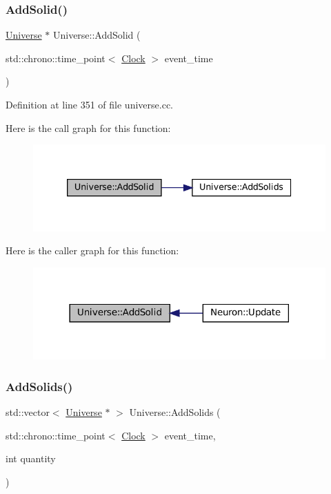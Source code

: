 \subsubsection{\texorpdfstring{Add\+Solid()}{AddSolid()}}
{\footnotesize\ttfamily \mbox{\hyperlink{class_universe}{Universe}} $\ast$ Universe\+::\+Add\+Solid (\begin{DoxyParamCaption}\item[{std\+::chrono\+::time\+\_\+point$<$ \mbox{\hyperlink{universe_8h_a0ef8d951d1ca5ab3cfaf7ab4c7a6fd80}{Clock}} $>$}]{event\+\_\+time }\end{DoxyParamCaption})}



Definition at line 351 of file universe.\+cc.

Here is the call graph for this function\+:\nopagebreak
\begin{figure}[H]
\begin{center}
\leavevmode
\includegraphics[width=339pt]{class_universe_a598799e2fcdf9ed60e83e9f5a61bfc05_cgraph}
\end{center}
\end{figure}
Here is the caller graph for this function\+:\nopagebreak
\begin{figure}[H]
\begin{center}
\leavevmode
\includegraphics[width=318pt]{class_universe_a598799e2fcdf9ed60e83e9f5a61bfc05_icgraph}
\end{center}
\end{figure}
\mbox{\label{class_universe_a410d5ba2224fe90584b1f1aa5b38b41c}} 
\subsubsection{\texorpdfstring{Add\+Solids()}{AddSolids()}}
{\footnotesize\ttfamily std\+::vector$<$ \mbox{\hyperlink{class_universe}{Universe}} $\ast$ $>$ Universe\+::\+Add\+Solids (\begin{DoxyParamCaption}\item[{std\+::chrono\+::time\+\_\+point$<$ \mbox{\hyperlink{universe_8h_a0ef8d951d1ca5ab3cfaf7ab4c7a6fd80}{Clock}} $>$}]{event\+\_\+time,  }\item[{int}]{quantity }\end{DoxyParamCaption})}



